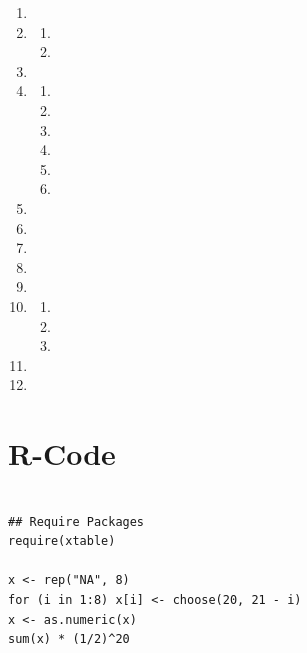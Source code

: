 \documentclass[12pt]{article}\usepackage[]{graphicx}\usepackage[]{color}
\begin{document}
\begin{enumerate}
\item
\item
\begin{enumerate}[label = (\alph*)]
\item
\item
\end{enumerate}
\item
\item 
\begin{enumerate}[label = (\alph*)]
\item
\item
\item
\item
\item
\item
\end{enumerate}
\item
\item
\item
\item 
\item
\item 
\begin{enumerate}[label = (\alph*)]
\item
\item
\item
\end{enumerate}
\item
\item 
\end{enumerate}
\newpage
\section*{R-Code}
\begin{verbatim}

## Require Packages
require(xtable)

x <- rep("NA", 8)
for (i in 1:8) x[i] <- choose(20, 21 - i)
x <- as.numeric(x)
sum(x) * (1/2)^20



\end{verbatim}
\end{document}
